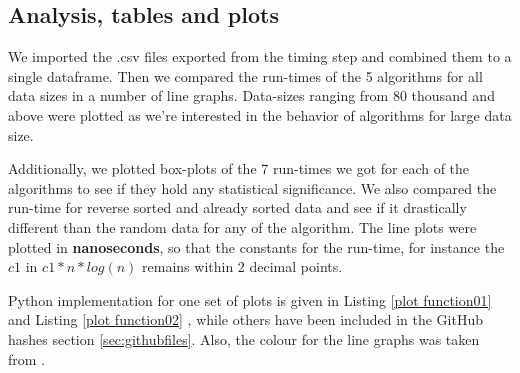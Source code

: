 \documentclass[sigconf, nonacm, natbib, screen, balance=False]{acmart}
\begin{document}
\subsection{Analysis, tables and plots}\label{sec:analysis}
We imported the .csv files exported from the timing step and combined them to a single dataframe. Then we compared the run-times of the 5 algorithms for all data sizes in a number of line graphs. Data-sizes ranging from 80 thousand and above were plotted as we're interested in the behavior of algorithms for large data size. 

Additionally, we plotted box-plots of the 7 run-times we got for each of the algorithms to see if they hold any statistical significance. We also compared the run-time for reverse sorted and already sorted data and see if it drastically different than the random data for any of the algorithm. The line plots were plotted in \textbf{nanoseconds}, so that the constants for the run-time, for instance the $c1$ in  $c1*n*log(n)$ remains within 2 decimal points.

Python implementation for one set of plots is given in Listing \ref{plot function01}  and Listing \ref{plot function02} , while others have been included in the GitHub hashes section \ref{sec:githubfiles}. Also, the colour for the line graphs was taken from \citet{colorcombo}.
\end{document}
